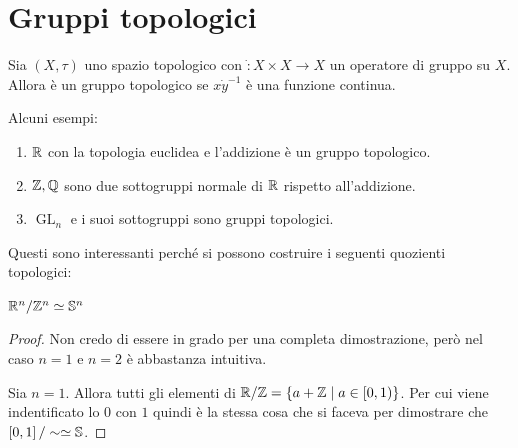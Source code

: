 \section{Gruppi topologici}

\begin{definition}
	Sia $(X, \tau)$ uno spazio topologico con $\dot \colon X \times X \rightarrow X$ un operatore di gruppo su $X$. Allora è un gruppo topologico se $x \dot y^{-1}$ è una funzione continua.
\end{definition}

Alcuni esempi:
\begin{enumerate}
	\item $\R$ con la topologia euclidea e l'addizione è un gruppo topologico.
	\item $\Z, \Q$ sono due sottogruppi normale di $\R$ rispetto all'addizione. 
	\item $\operatorname{GL}_n$ e i suoi sottogruppi sono gruppi topologici.
\end{enumerate}

Questi sono interessanti perché si possono costruire i seguenti quozienti topologici:
\begin{theorem}
	$\R^n / \Z^n \simeq \S^n$
\end{theorem}
\begin{proof}
	Non credo di essere in grado per una completa dimostrazione, però nel caso $n=1$ e $n=2$ è abbastanza intuitiva.
	
	Sia $n=1$. Allora tutti gli elementi di $\R / \Z = \{a + \Z \; |\; a \in \left[0,1\right) \}$.  
	Per cui viene indentificato lo $0$ con $1$ quindi è la stessa cosa che si faceva per dimostrare che $\left[0,1\right]/ \sim \simeq \S$. 
\end{proof}
